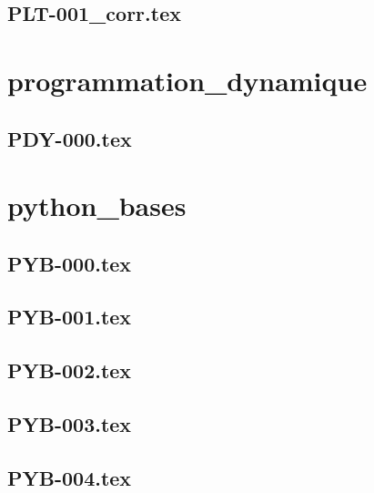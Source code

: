 \renewcommand{\xxexo}{PLT-001_corr.tex} 
\subsection*{\xxexo} 
\graphicspath{{../../exosplot/equadiffs/\xxexo/}}
 
 
\section*{programmation_dynamique}
\renewcommand{\xxexo}{PDY-000.tex} 
\subsection*{\xxexo} 
\graphicspath{{../../exosprogrammation_dynamique/equadiffs/\xxexo/}}
 
 
\section*{python_bases}
\renewcommand{\xxexo}{PYB-000.tex} 
\subsection*{\xxexo} 
\graphicspath{{../../exospython_bases/equadiffs/\xxexo/}}
 
 
\renewcommand{\xxexo}{PYB-001.tex} 
\subsection*{\xxexo} 
\graphicspath{{../../exospython_bases/equadiffs/\xxexo/}}
 
 
\renewcommand{\xxexo}{PYB-002.tex} 
\subsection*{\xxexo} 
\graphicspath{{../../exospython_bases/equadiffs/\xxexo/}}
 
 
\renewcommand{\xxexo}{PYB-003.tex} 
\subsection*{\xxexo} 
\graphicspath{{../../exospython_bases/equadiffs/\xxexo/}}
 
 
\renewcommand{\xxexo}{PYB-004.tex} 
\subsection*{\xxexo} 
\graphicspath{{../../exospython_bases/equadiffs/\xxexo/}}
 
 
